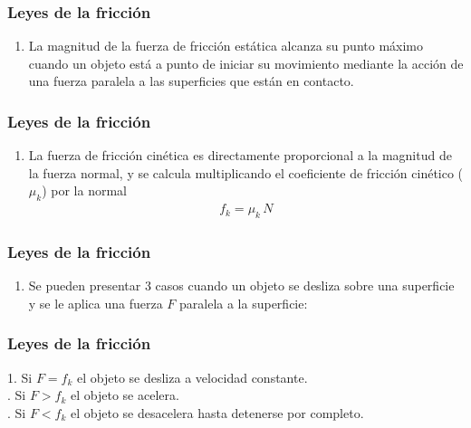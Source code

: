 \documentclass[14pt]{beamer}
\begin{document}
\begin{frame}
\frametitle{Leyes de la fricción}
\begin{enumerate}[<+->]
\conti
\item La magnitud de la fuerza de fricción estática alcanza su punto máximo cuando un objeto está a punto de iniciar su movimiento mediante la acción de una fuerza paralela a las superficies que están en contacto.
\seti
\end{enumerate}
\end{frame}
\begin{frame}
\frametitle{Leyes de la fricción}
\begin{enumerate}[<+->]
\conti
\item La fuerza de fricción cinética es directamente proporcional a la magnitud de la fuerza normal, y se calcula multiplicando el coeficiente de fricción cinético ($\mu_{k}$) por la normal
\begin{align*}
f_{k} = \mu_{k} \, N
\end{align*}
\seti
\end{enumerate}
\end{frame}
\begin{frame}
\frametitle{Leyes de la fricción}
\begin{enumerate}[<+->]
\conti
\item Se pueden presentar 3 casos cuando un objeto se desliza sobre una superficie y se le aplica una fuerza $F$ paralela a la superficie:
\seti
\end{enumerate}
\end{frame}
\begin{frame}
\frametitle{Leyes de la fricción}
1. Si $F = f_{k}$ el objeto se desliza a velocidad constante. \\[0.25em] . Si $F > f_{k}$ el objeto se acelera. \\[0.25em] . Si $F < f_{k}$ el objeto se desacelera hasta detenerse por completo.
\end{frame}
\end{document}
